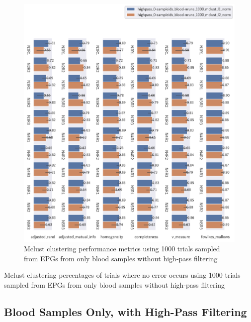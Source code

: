 \begin{theappendices}
\begin{figure}[htbp]
\centering
\includegraphics[width=\textwidth]{./figures/clust_comparison/highpass_0-sampleids_blood-nruns_1000_mclust.pdf}
\caption{Mclust clustering performance metrics using 1000 trials sampled from EPGs from only blood samples without high-pass filtering}
\label{appendix:fig:highpass_0-sampleids_blood-nruns_1000_mclust}
\end{figure}

\begin{table}[htbp]
\centering
{}
\caption{Mclust clustering percentages of trials where no error occurs using 1000 trials sampled from EPGs from only blood samples without high-pass filtering}
\label{appendix:table:highpass_0-sampleids_blood-nruns_1000_mclust}
\end{table}

\FloatBarrier
\subsection{Blood Samples Only, with High-Pass Filtering}


\end{theappendices}
